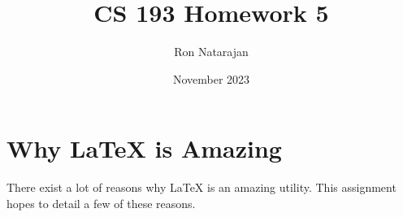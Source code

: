 \documentclass{article}
\title{CS 193 Homework 5}
\author{Ron Natarajan}
\date{November 2023}
\begin{document}
\maketitle

\section{Why LaTeX is Amazing}
There exist a lot of reasons why LaTeX is an amazing utility. This assignment
hopes to detail a few of these reasons.



\end{document}
